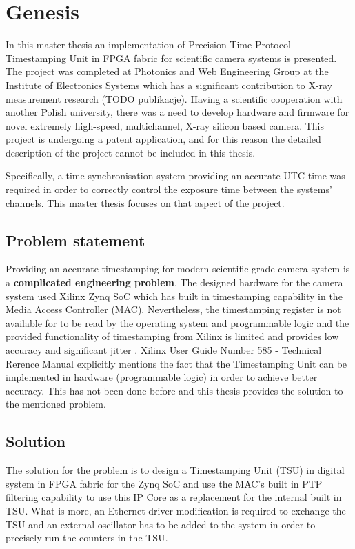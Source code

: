 \chapter{Genesis}

In this master thesis an implementation of Precision-Time-Protocol Timestamping Unit in FPGA fabric for scientific
camera systems is presented. The project was completed at Photonics and Web Engineering Group at the Institute of 
Electronics Systems which has a significant contribution to X-ray measurement research (TODO publikacje).  Having a scientific cooperation with
another Polish university, there was a need to develop hardware and firmware for novel extremely high-speed,
multichannel, X-ray silicon based camera. This project is undergoing a patent application, and for this reason the 
detailed description of the project cannot be included in this thesis. 

Specifically, a time synchronisation system providing an accurate UTC time was required in order to correctly control
the exposure time between the systems' channels.  This master thesis focuses on that aspect of the project.   


\section{Problem statement}
Providing an accurate timestamping for modern scientific grade camera system is a \textbf{complicated engineering
problem}. The designed hardware for the camera system used Xilinx Zynq SoC\cite{XIL:ZYNQ} which has built
in timestamping capability in the Media Access Controller (MAC). Nevertheless, the timestamping register is not available for
to be read by the operating system and programmable logic \cite[16.4.2]{XIL:ZYNQ_TRM} and the provided functionality of timestamping from
Xilinx is limited and provides low accuracy \cite[16.2.7]{XIL:ZYNQ_TRM} and significant jitter \cite{XIL:PTP_TESTS}. 
Xilinx User Guide Number 585 - Technical Rerence Manual explicitly mentions the fact that the Timestamping Unit can be 
implemented in hardware (programmable logic) in order to achieve better accuracy. This has not been done before and 
this thesis provides the solution to the mentioned problem. 

\section{Solution}
The solution for the problem is to design a Timestamping Unit (TSU) in digital system in FPGA fabric for the Zynq SoC
and use the MAC's built in PTP filtering capability to use this IP Core as a replacement for the internal built in TSU.
What is more, an Ethernet driver modification is required to exchange the TSU and an external oscillator has to be added
to the system in order to precisely run the counters in the TSU. 

